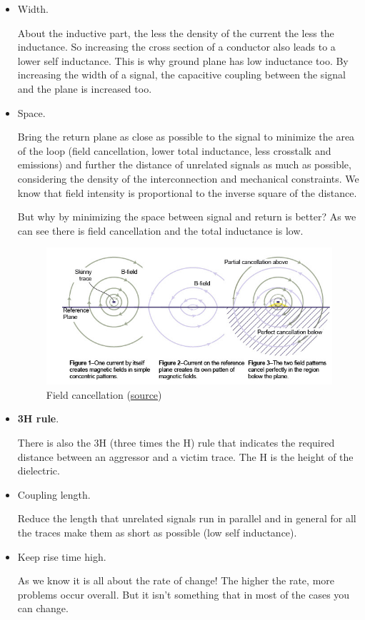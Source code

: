 \documentclass[final]{cubedoc}
\begin{document}
	\begin{itemize}
		\item Width.
		
		
		About the inductive part, the less the density of the current the less the inductance. So increasing the cross section of a conductor also leads to a lower self inductance. This is why ground plane has low inductance too. By increasing the width of a signal, the capacitive coupling between the signal and the plane is increased too.
		\item Space.
		
		Bring the return plane as close as possible to the signal to minimize the area of the loop (field cancellation, lower total inductance, less crosstalk and emissions) and further the distance of unrelated signals as much as possible, considering the density of the interconnection and mechanical constraints. We know that field intensity is proportional to the inverse square of the distance.
		
		But why by minimizing the space between signal and return is better? As we can see there is field cancellation and the total inductance is low. 
		
		\begin{figure}[h!]
			\centering
			\includegraphics[keepaspectratio, width = \textwidth]{assets/field_cancellation.png}	
			\caption{Field cancellation \small{(\href{https://web.archive.org/web/20200814095523/http://www.signalintegrity.com/Pubs/edn/FieldCancellation.htm}{source})}}
		\end{figure}
		
		\item \textbf{3H rule}.
		
		There is also the 3H (three times the H) rule that indicates the required distance between an aggressor and a victim trace. The H is the height of the dielectric.
		
		\item Coupling length.
		
		Reduce the length that unrelated signals run in parallel and in general for all the traces make them as short as possible (low self inductance).
		
		\item Keep rise time high.
		
		As we know it is all about the rate of change! The higher the rate, more problems occur overall. But it isn't something that in most of the cases you can change.
	\end{itemize}
	
\end{document}
